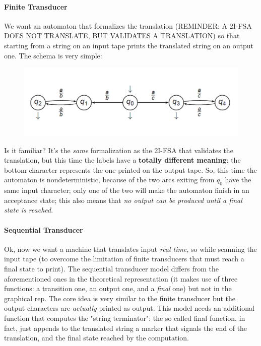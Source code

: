 				\paragraph{Finite Transducer}
					We want an automaton that formalizes the translation (REMINDER: A 2I-FSA DOES NOT TRANSLATE, BUT VALIDATES A TRANSLATION) so that starting from a 
					string on an input tape prints the translated string on an output one. The schema is very simple:
					\begin{figure}[H]
						\centering
						\includegraphics[width = \textwidth]{./images/2IFSA.png}
					\end{figure}
					Is it familiar? It's the \emph{same} formalization as the 2I-FSA that validates the translation, but this time the labels have a 
					\textbf{totally different meaning}: the bottom character represents the one printed on the output tape. So, this time the automaton is 
					nondeterministic, because of the two arcs exiting from $q_0$ have the same input character; only one of the two will make the automaton 
					finish in an acceptance state; this also means that \emph{no output can be produced until a final state is reached}.
					
				\paragraph{Sequential Transducer}
					Ok, now we want a machine that translates input \emph{real time}, so while scanning the input tape (to overcome the limitation of finite 
					transducers that must reach a final state to print). The sequential transducer model differs from the aforementioned ones in the theoretical 
					representation (it makes use of three functions: a transition one, an output one, and a \emph{final} one) but not in the graphical rep. The 
					core idea is very similar to the finite transducer but the output characters are \emph{actually} printed as output. This model needs an 
					additional function that computes the "string terminator": the so called final function, in fact, just appends to the translated string a 
					marker that signals the end of the translation, and the final state reached by the computation.

